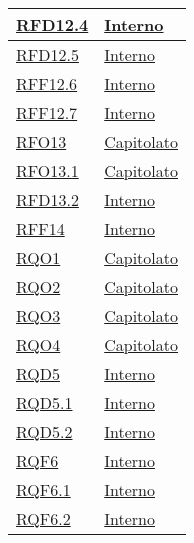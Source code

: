 \begin{longtable}{|>{\centering}m{5cm}|m{5cm}<{\centering}|}
\hyperlink{RFD12.4}{RFD12.4} & \hyperlink{Interno}{Interno}\\ \hline

\hyperlink{RFD12.5}{RFD12.5} & \hyperlink{Interno}{Interno}\\ \hline

\hyperlink{RFF12.6}{RFF12.6} & \hyperlink{Interno}{Interno}\\ \hline

\hyperlink{RFF12.7}{RFF12.7} & \hyperlink{Interno}{Interno}\\ \hline

\hyperlink{RFO13}{RFO13} & \hyperlink{Capitolato}{Capitolato}\\ \hline

\hyperlink{RFO13.1}{RFO13.1} & \hyperlink{Capitolato}{Capitolato}\\ \hline

\hyperlink{RFD13.2}{RFD13.2} & \hyperlink{Interno}{Interno}\\ \hline

\hyperlink{RFF14}{RFF14} & \hyperlink{Interno}{Interno}\\ \hline

\hyperlink{RQO1}{RQO1} & \hyperlink{Capitolato}{Capitolato}\\ \hline

\hyperlink{RQO2}{RQO2} & \hyperlink{Capitolato}{Capitolato}\\ \hline

\hyperlink{RQO3}{RQO3} & \hyperlink{Capitolato}{Capitolato}\\ \hline

\hyperlink{RQO4}{RQO4} & \hyperlink{Capitolato}{Capitolato}\\ \hline

\hyperlink{RQD5}{RQD5} & \hyperlink{Interno}{Interno}\\ \hline

\hyperlink{RQD5.1}{RQD5.1} & \hyperlink{Interno}{Interno}\\ \hline

\hyperlink{RQD5.2}{RQD5.2} & \hyperlink{Interno}{Interno}\\ \hline

\hyperlink{RQF6}{RQF6} & \hyperlink{Interno}{Interno}\\ \hline

\hyperlink{RQF6.1}{RQF6.1} & \hyperlink{Interno}{Interno}\\ \hline

\hyperlink{RQF6.2}{RQF6.2} & \hyperlink{Interno}{Interno}\\ \hline


\end{longtable}
